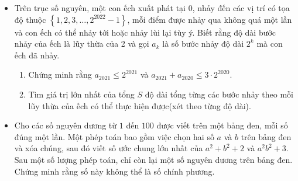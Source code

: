 \documentclass[11pt]{scrartcl}
\begin{document}
\begin{itemize}[label=, leftmargin=0em, itemsep=-0em]

    \item \begin{btvn}
        Trên trục số nguyên, một con ếch xuất phát tại 0, nhảy đến các vị trí có tọa độ thuộc $\left\{1,2,3, \ldots, 2^{2022}-1\right\}$, mỗi điểm được nhảy qua không quá một lần và con ếch có thể nhảy tới hoặc nhảy lùi lại tùy ý. Biết rằng độ dài bước nhảy của ếch là lũy thừa của 2 và gọi $a_k$ là số bước nhảy độ dài $2^k$ mà con ếch đã nhảy.
    \begin{enumerate}[label=(\alph*)]
        \item Chứng minh rằng $a_{2021} \leq 2^{2021}$ và $a_{2021}+a_{2020} \leq 3 \cdot 2^{2020}$.
        \item Tìm giá trị lớn nhất của tổng $S$ độ dài tổng từng các bước nhảy theo mỗi lũy thừa của ếch có thể thực hiện được(xét theo từng độ dài).
    \end{enumerate}
    \end{btvn}
    \item \begin{btvn}
        Cho các số nguyên dương từ $1$ đến $100$ được viết trên một bảng đen, mỗi số đúng một lần. Một phép toán bao gồm việc chọn hai số $a$ và $b$ trên bảng đen và xóa chúng, sau đó viết số ước chung lớn nhất của $a^2+b^2+2$ và $a^2b^2+3$. Sau một số lượng phép toán, chỉ còn lại một số nguyên dương trên bảng đen. Chứng minh rằng số này không thể là số chính phương.
    \end{btvn}

\end{itemize}
\end{document}
